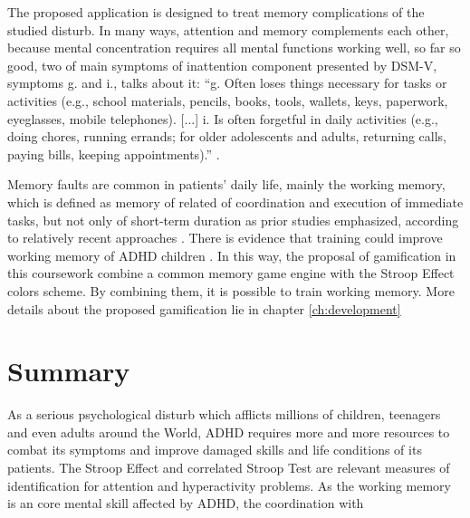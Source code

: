 The proposed application is designed to treat memory complications of the studied disturb. In many ways, attention and memory complements each other, because mental concentration requires all mental functions working well, so far so good, two of main symptoms of inattention component presented by DSM-V, symptoms g. and i., talks about it: ``g. Often loses things necessary for tasks or activities (e.g., school materials, 
pencils, books, tools, wallets, keys, paperwork, eyeglasses, mobile telephones).  [...] i. Is often forgetful in daily activities (e.g., doing chores, running errands; for older adolescents and adults, returning calls, paying bills, keeping appointments).'' \cite{dsm-american}.

Memory faults are common in patients' daily life, mainly the working memory, which is defined as memory of related of coordination and execution of immediate tasks, but not only of short-term duration as prior studies emphasized, according to relatively recent approaches \citep{working_memory}. There is evidence that training could improve working memory of ADHD children \citep{adhd_memory}. In this way, the proposal of gamification in this coursework combine a common memory game engine with the Stroop Effect colors scheme. By combining them, it is possible to train working memory. More details about the proposed gamification lie in chapter \ref{ch:development}


\section{Summary}

As a serious psychological disturb which afflicts millions of children, teenagers and even adults around the World, ADHD requires more and more resources to combat its symptoms and improve damaged skills and life conditions of its patients. The Stroop Effect and correlated Stroop Test are relevant measures of identification for attention and hyperactivity problems. As the working memory is an core mental skill affected by ADHD, the coordination with